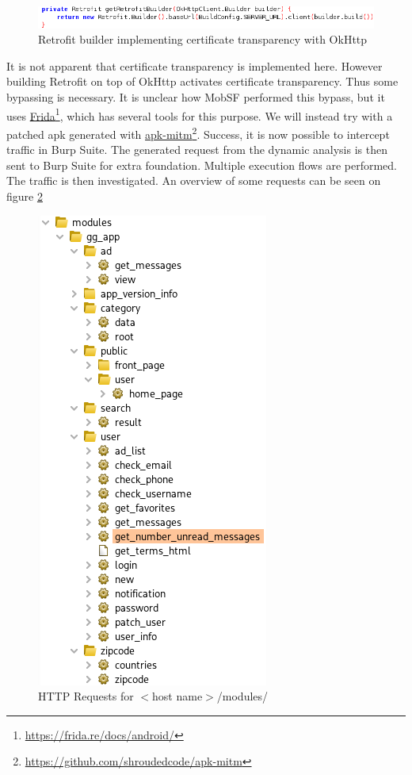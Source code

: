 \begin{figure}[htbp]
    \centering
    \includegraphics[width=1\columnwidth]{../static-analysis/pictures/retrofit-okkhtp-builder.png}
    \caption{Retrofit builder implementing certificate transparency with OkHttp}
    \label{fig:retrofit-ct}
\end{figure}

It is not apparent that certificate transparency is implemented here. However building Retrofit on top of OkHttp activates certificate transparency\cite{android-certificate-transparency}. Thus some bypassing is necessary. It is unclear how MobSF performed this bypass, but it uses \href{https://frida.re/docs/android/}{Frida}\footnote{\href{https://frida.re/docs/android/}{https://frida.re/docs/android/}}, which has several tools for this purpose. We will instead try with a patched apk generated with \href{https://github.com/shroudedcode/apk-mitm}{apk-mitm}\footnote{\href{https://github.com/shroudedcode/apk-mitm}{https://github.com/shroudedcode/apk-mitm}}. Success, it is now possible to intercept traffic in Burp Suite. The generated request from the dynamic analysis is then sent to Burp Suite for extra foundation. Multiple execution flows are performed. The traffic is then investigated. An overview of some requests can be seen on figure \ref{fig:http-requests-modules}    

\begin{figure}[h!]
    \centering
    \includegraphics[width=0.5\columnwidth]{../dynamic-analysis/pictures/http-requests-modules.png}
    \caption{HTTP Requests for $<$host name$>$/modules/}
    \label{fig:http-requests-modules}
\end{figure}

